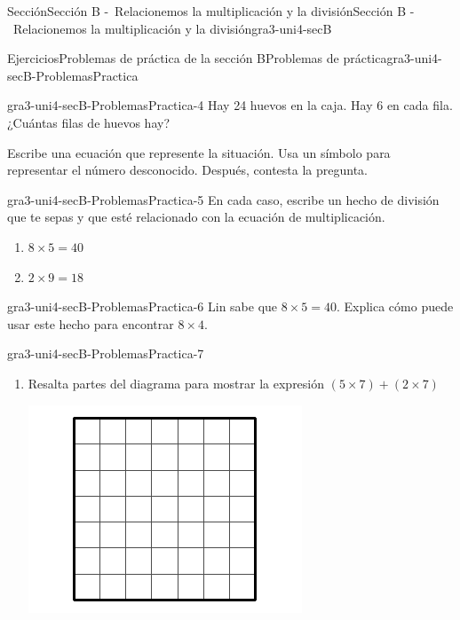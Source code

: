 \documentclass[twoside,10pt,]{article}
\begin{document}
\begin{sectionptx}{Sección}{Sección B -~Relacionemos la multiplicación y la división}{}{Sección B -~Relacionemos la multiplicación y la división}{}{}{gra3-uni4-secB}
\begin{exercises-subsection}{Ejercicios}{Problemas de práctica de la sección B}{}{Problemas de práctica}{}{}{gra3-uni4-secB-ProblemasPractica}
\begin{divisionexercise}{2}{}{}{gra3-uni4-secB-ProblemasPractica-4}%
Hay 24 huevos en la caja. Hay 6 en cada fila. ¿Cuántas filas de huevos hay?%
\par
Escribe una ecuación que represente la situación. Usa un símbolo para representar el número desconocido. Después, contesta la pregunta.%
\end{divisionexercise}%
\begin{divisionexercise}{3}{}{}{gra3-uni4-secB-ProblemasPractica-5}%
En cada caso, escribe un hecho de división que te sepas y que esté relacionado con la ecuación de multiplicación.%
%
\begin{enumerate}[label={(\alph*)}]
\item{}\(\displaystyle 8 \times 5 = 40\)%
\item{}\(\displaystyle 2 \times 9 = 18\)%
\end{enumerate}
\end{divisionexercise}%
\begin{divisionexercise}{4}{}{}{gra3-uni4-secB-ProblemasPractica-6}%
Lin sabe que \(8 \times 5 = 40\). Explica cómo puede usar este hecho para encontrar \(8 \times 4\).%
\end{divisionexercise}%
\begin{divisionexercise}{5}{}{}{gra3-uni4-secB-ProblemasPractica-7}%
%
\begin{enumerate}[label={(\alph*)}]
\item{}Resalta partes del diagrama para mostrar la expresión \((5 \times 7) + (2 \times 7)\)%
\begin{image}{0}{1}{0}{}%
\includegraphics[width=\linewidth]{external/svg-source/tikz-file-151677-scale13.pdf}

\end{image}
\end{enumerate}
\end{divisionexercise}
\end{exercises-subsection}
\end{sectionptx}
\end{document}

